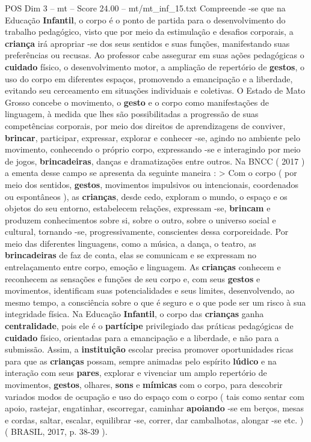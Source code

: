 \begin{textsample}{POS Dim 3 – mt – Score 24.00 – mt/mt\_inf\_15.txt}
Compreende -se que na Educação \textbf{Infantil}, o corpo é o ponto de partida para o desenvolvimento do trabalho pedagógico, visto que por meio da estimulação e desafios corporais, a \textbf{criança} irá apropriar -se dos seus sentidos e suas funções, manifestando suas preferências ou recusas.
Ao professor cabe assegurar em suas ações pedagógicas o \textbf{cuidado} físico, o desenvolvimento motor, a ampliação de repertório de \textbf{gestos}, o uso do corpo em diferentes espaços, promovendo a emancipação e a liberdade, evitando seu cerceamento em situações individuais e coletivas.
O Estado de Mato Grosso concebe o movimento, o \textbf{gesto} e o corpo como manifestações de linguagem, à medida que lhes são possibilitadas a progressão de suas competências corporais, por meio dos direitos de aprendizagens de conviver, \textbf{brincar}, participar, expressar, explorar e conhecer -se, agindo no ambiente pelo movimento, conhecendo o próprio corpo, expressando -se e interagindo por meio de jogos, \textbf{brincadeiras}, danças e dramatizações entre outros.
Na BNCC ( 2017 ) a ementa desse campo se apresenta da seguinte maneira : > Com o corpo ( por meio dos sentidos, \textbf{gestos}, movimentos impulsivos ou intencionais, coordenados ou espontâneos ), as \textbf{crianças}, desde cedo, exploram o mundo, o espaço e os objetos do seu entorno, estabelecem relações, expressam -se, \textbf{brincam} e produzem conhecimentos sobre si, sobre o outro, sobre o universo social e cultural, tornando -se, progressivamente, conscientes dessa corporeidade.
Por meio das diferentes linguagens, como a música, a dança, o teatro, as \textbf{brincadeiras} de faz de conta, elas se comunicam e se expressam no entrelaçamento entre corpo, emoção e linguagem.
As \textbf{crianças} conhecem e reconhecem as sensações e funções de seu corpo e, com seus \textbf{gestos} e movimentos, identificam suas potencialidades e seus limites, desenvolvendo, ao mesmo tempo, a consciência sobre o que é seguro e o que pode ser um risco à sua integridade física.
Na Educação \textbf{Infantil}, o corpo das \textbf{crianças} ganha \textbf{centralidade}, pois ele é o \textbf{partícipe} privilegiado das práticas pedagógicas de \textbf{cuidado} físico, orientadas para a emancipação e a liberdade, e não para a submissão.
Assim, a \textbf{instituição} escolar precisa promover oportunidades ricas para que as \textbf{crianças} possam, sempre animadas pelo espírito \textbf{lúdico} e na interação com seus \textbf{pares}, explorar e vivenciar um amplo repertório de movimentos, \textbf{gestos}, olhares, \textbf{sons} e \textbf{mímicas} com o corpo, para descobrir variados modos de ocupação e uso do espaço com o corpo ( tais como sentar com apoio, rastejar, engatinhar, escorregar, caminhar \textbf{apoiando} -se em berços, mesas e cordas, saltar, escalar, equilibrar -se, correr, dar cambalhotas, alongar -se etc. ) ( BRASIL, 2017, p. 38-39 ).

\end{textsample}
